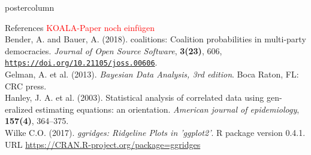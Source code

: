 \documentclass[final,hyperref={pdfpagelabels=false}]{beamer}
\begin{document}
\begin{frame}
\begin{columns}
\begin{column}{1\textwidth}
\vspace{12px}
\begin{beamercolorbox}[center,wd=\textwidth]{postercolumn}
\begin{minipage}[T]{.95\textwidth}  %
\begin{block}{\footnotesize References}
{\footnotesize
\textcolor{red}{KOALA-Paper noch einf\"ugen} \\
Bender, A. and Bauer, A. (2018). coalitions: Coalition probabilities in multi-party democracies.
\textit{Journal of Open Source Software}, \textbf{3(23)}, 606,
\href{https://doi.org/10.21105/joss.00606}{\texttt{https://doi.org/10.21105/joss.00606}}. \\
Gelman, A. et al. (2013). \textit{Bayesian Data Analysis, 3rd edition}. Boca Raton, FL: CRC press. \\
Hanley, J. A. et al. (2003). Statistical analysis of correlated data using gen-
eralized estimating equations: an orientation. \textit{American journal of epidemiology},
\textbf{157(4)}, 364--375. \\
Wilke C.O. (2017). \textit{ggridges: Ridgeline Plots in 'ggplot2'}. R package version
0.4.1. URL \href{https://CRAN.R-project.org/package=ggridges}{https://CRAN.R-project.org/package=ggridges}
}
\end{block}
\end{minipage}
\end{beamercolorbox}

\end{column} %
\end{columns}
\end{frame}
\end{document}
